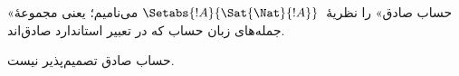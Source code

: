 \documentclass[../../../include/open-logic-section]{subfiles}
\begin{document}
«حساب صادق» را نظریهٔ~$\Setabs{!A}{ \Sat{\Nat}{!A}}$ می‌نامیم؛ یعنی
مجموعهٔ جمله‌های زبان حساب که در تعبیر استاندارد صادق‌اند.

\begin{cor}
حساب صادق تصمیم‌پذیر نیست.
\end{cor}

\end{document}
